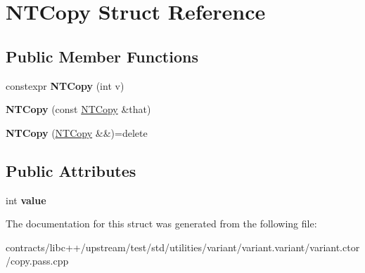 \hypertarget{struct_n_t_copy}{}\section{N\+T\+Copy Struct Reference}
\label{struct_n_t_copy}
\subsection*{Public Member Functions}
\begin{DoxyCompactItemize}
\item 
\mbox{\label{struct_n_t_copy_af897d2bcc568a0d70e8912e797ddaf15}} 
constexpr {\bfseries N\+T\+Copy} (int v)
\item 
\mbox{\label{struct_n_t_copy_a0078fb7faa7b14c8982f390d3fb9fe35}} 
{\bfseries N\+T\+Copy} (const \mbox{\hyperlink{struct_n_t_copy}{N\+T\+Copy}} \&that)
\item 
\mbox{\label{struct_n_t_copy_a24a5b74c1ff123b3b1ebfbf9c5feeb4d}} 
{\bfseries N\+T\+Copy} (\mbox{\hyperlink{struct_n_t_copy}{N\+T\+Copy}} \&\&)=delete
\end{DoxyCompactItemize}
\subsection*{Public Attributes}
\begin{DoxyCompactItemize}
\item 
\mbox{\label{struct_n_t_copy_a7a82f34bd61485ade39e8dcf02d48dd0}} 
int {\bfseries value}
\end{DoxyCompactItemize}


The documentation for this struct was generated from the following file\+:\begin{DoxyCompactItemize}
\item 
contracts/libc++/upstream/test/std/utilities/variant/variant.\+variant/variant.\+ctor/copy.\+pass.\+cpp\end{DoxyCompactItemize}
